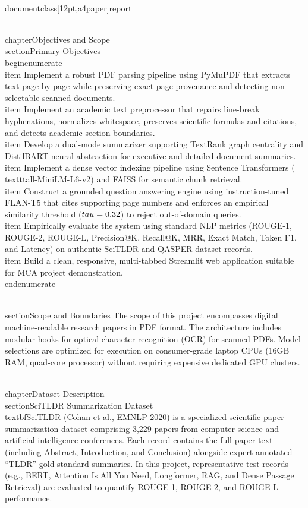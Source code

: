 \\documentclass[12pt,a4paper]{report}
\begin{document}
\\chapter{Objectives and Scope}
\\section{Primary Objectives}
\\begin{enumerate}
    \\item Implement a robust PDF parsing pipeline using PyMuPDF that extracts text page-by-page while preserving exact page provenance and detecting non-selectable scanned documents.
    \\item Implement an academic text preprocessor that repairs line-break hyphenations, normalizes whitespace, preserves scientific formulas and citations, and detects academic section boundaries.
    \\item Develop a dual-mode summarizer supporting TextRank graph centrality and DistilBART neural abstraction for executive and detailed document summaries.
    \\item Implement a dense vector indexing pipeline using Sentence Transformers (\\texttt{all-MiniLM-L6-v2}) and FAISS for semantic chunk retrieval.
    \\item Construct a grounded question answering engine using instruction-tuned FLAN-T5 that cites supporting page numbers and enforces an empirical similarity threshold ($\\tau = 0.32$) to reject out-of-domain queries.
    \\item Empirically evaluate the system using standard NLP metrics (ROUGE-1, ROUGE-2, ROUGE-L, Precision@K, Recall@K, MRR, Exact Match, Token F1, and Latency) on authentic SciTLDR and QASPER dataset records.
    \\item Build a clean, responsive, multi-tabbed Streamlit web application suitable for MCA project demonstration.
\\end{enumerate}

\\section{Scope and Boundaries}
The scope of this project encompasses digital machine-readable research papers in PDF format. The architecture includes modular hooks for optical character recognition (OCR) for scanned PDFs. Model selections are optimized for execution on consumer-grade laptop CPUs (16GB RAM, quad-core processor) without requiring expensive dedicated GPU clusters.

\\chapter{Dataset Description}
\\section{SciTLDR Summarization Dataset}
\\textbf{SciTLDR} (Cohan et al., EMNLP 2020) is a specialized scientific paper summarization dataset comprising 3,229 papers from computer science and artificial intelligence conferences. Each record contains the full paper text (including Abstract, Introduction, and Conclusion) alongside expert-annotated ``TLDR'' gold-standard summaries. In this project, representative test records (e.g., BERT, Attention Is All You Need, Longformer, RAG, and Dense Passage Retrieval) are evaluated to quantify ROUGE-1, ROUGE-2, and ROUGE-L performance.
\end{document}
